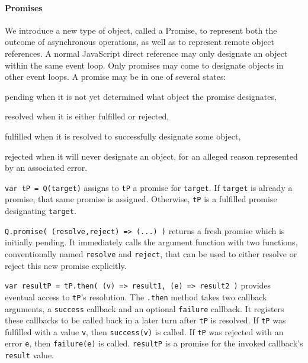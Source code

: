 \documentclass{llncs}
\begin{document}
\paragraph{Promises}

We introduce a new type of object, called a Promise, to represent both the outcome of asynchronous operations, as well as to represent remote object references. A normal JavaScript direct reference may only designate an object within the same event loop. Only promises may come to designate objects in other event loops. A promise may be in one of several states:

\begin{description*}
  \item[pending] when it is not yet determined what object the promise designates,
  \item[resolved] when it is either fulfilled or rejected,
  \begin{description*}
    \item[fulfilled] when it is resolved to successfully designate some object,
    \item[rejected] when it will never designate an object, for an alleged reason represented by an associated error.
  \end{description*}
\end{description*}


\begin{description*}
\item[{\tt var tP = Q(target)}] assigns to {\tt tP} a promise for {\tt target}. If {\tt target} is already a promise, that same promise is assigned. Otherwise, {\tt tP} is a fulfilled promise designating {\tt target}.

\item[{\tt Q.promise( (resolve,reject) => (...) )}] returns a fresh promise which is initially pending. It immediately calls the argument function with two functions, conventionally named {\tt resolve} and {\tt reject}, that can be used to either resolve or reject this new promise explicitly. 

\item[{\tt var resultP = tP.then( (v) => result1, (e) => result2 )}] provides eventual access to {\tt tP}'s resolution. The {\tt .then} method takes two callback arguments, a \texttt{success} callback and an optional \texttt{failure} callback. It registers these callbacks to be called back in a later turn after {\tt tP} is resolved. If {\tt tP} was fulfilled with a value {\tt v}, then {\tt success(v)} is called. If {\tt tP} was rejected with an error {\tt e}, then {\tt failure(e)} is called. {\tt resultP} is a promise for the invoked callback's {\tt result} value. 
\end{description*}
\end{document}
